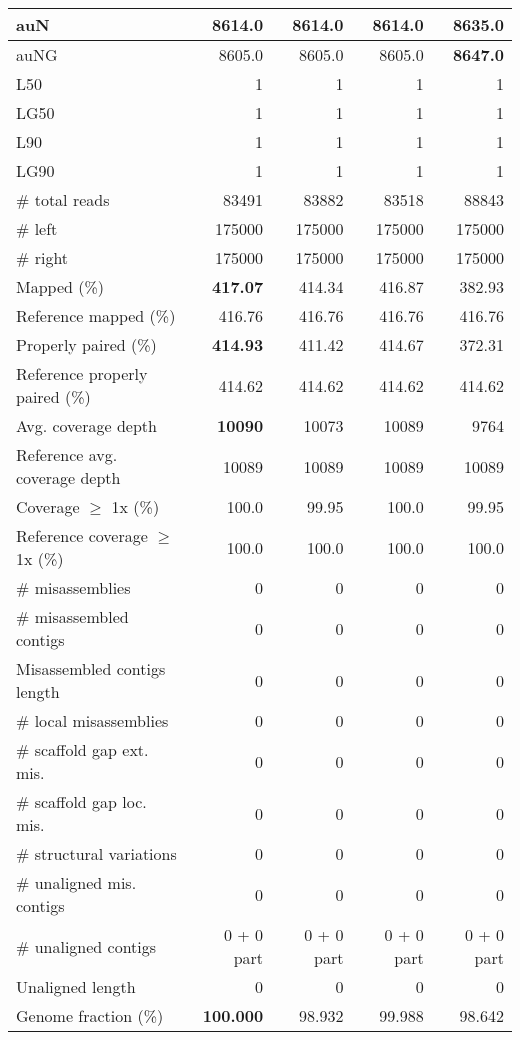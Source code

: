 \documentclass[12pt,a4paper]{article}
\begin{document}
\begin{table}[ht]
\begin{center}
\begin{tabular}{|l*{4}{|r}|}
auN & 8614.0 & 8614.0 & 8614.0 & {\bf 8635.0} \\ \hline
auNG & 8605.0 & 8605.0 & 8605.0 & {\bf 8647.0} \\ \hline
L50 & 1 & 1 & 1 & 1 \\ \hline
LG50 & 1 & 1 & 1 & 1 \\ \hline
L90 & 1 & 1 & 1 & 1 \\ \hline
LG90 & 1 & 1 & 1 & 1 \\ \hline
\# total reads & 83491 & 83882 & 83518 & 88843 \\ \hline
\# left & 175000 & 175000 & 175000 & 175000 \\ \hline
\# right & 175000 & 175000 & 175000 & 175000 \\ \hline
Mapped (\%) & {\bf 417.07} & 414.34 & 416.87 & 382.93 \\ \hline
Reference mapped (\%) & 416.76 & 416.76 & 416.76 & 416.76 \\ \hline
Properly paired (\%) & {\bf 414.93} & 411.42 & 414.67 & 372.31 \\ \hline
Reference properly paired (\%) & 414.62 & 414.62 & 414.62 & 414.62 \\ \hline
Avg. coverage depth & {\bf 10090} & 10073 & 10089 & 9764 \\ \hline
Reference avg. coverage depth & 10089 & 10089 & 10089 & 10089 \\ \hline
Coverage $\geq$ 1x (\%) & 100.0 & 99.95 & 100.0 & 99.95 \\ \hline
Reference coverage $\geq$ 1x (\%) & 100.0 & 100.0 & 100.0 & 100.0 \\ \hline
\# misassemblies & 0 & 0 & 0 & 0 \\ \hline
\# misassembled contigs & 0 & 0 & 0 & 0 \\ \hline
Misassembled contigs length & 0 & 0 & 0 & 0 \\ \hline
\# local misassemblies & 0 & 0 & 0 & 0 \\ \hline
\# scaffold gap ext. mis. & 0 & 0 & 0 & 0 \\ \hline
\# scaffold gap loc. mis. & 0 & 0 & 0 & 0 \\ \hline
\# structural variations & 0 & 0 & 0 & 0 \\ \hline
\# unaligned mis. contigs & 0 & 0 & 0 & 0 \\ \hline
\# unaligned contigs & 0 + 0 part & 0 + 0 part & 0 + 0 part & 0 + 0 part \\ \hline
Unaligned length & 0 & 0 & 0 & 0 \\ \hline
Genome fraction (\%) & {\bf 100.000} & 98.932 & 99.988 & 98.642 \\ \hline

\end{tabular}
\end{center}
\end{table}
\end{document}
